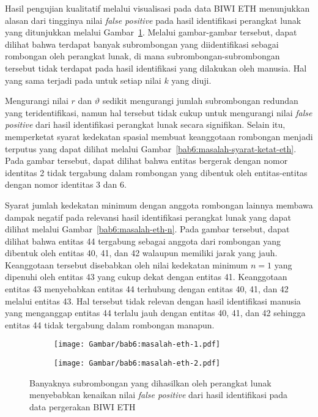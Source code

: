 Hasil pengujian kualitatif melalui visualisasi pada data BIWI ETH menunjukkan alasan dari tingginya nilai \textit{false positive} pada hasil identifikasi perangkat lunak yang ditunjukkan melalui Gambar~\ref{bab6:masalah-eth}. Melalui gambar-gambar tersebut, dapat dilihat bahwa terdapat banyak subrombongan yang diidentifikasi sebagai rombongan oleh perangkat lunak, di mana subrombongan-subrombongan tersebut tidak terdapat pada hasil identifikasi yang dilakukan oleh manusia. Hal yang sama terjadi pada untuk setiap nilai $k$ yang diuji.

Mengurangi nilai $r$ dan $\vartheta$ sedikit mengurangi jumlah subrombongan redundan yang teridentifikasi, namun hal tersebut tidak cukup untuk mengurangi nilai \textit{false positive} dari hasil identifikasi perangkat lunak secara signifikan. Selain itu, memperketat syarat kedekatan spasial membuat keanggotaan rombongan menjadi terputus yang dapat dilihat melalui Gambar~\ref{bab6:masalah-syarat-ketat-eth}. Pada gambar tersebut, dapat dilihat bahwa entitas bergerak dengan nomor identitas 2 tidak tergabung dalam rombongan yang dibentuk oleh entitas-entitas dengan nomor identitas 3 dan 6.

Syarat jumlah kedekatan minimum dengan anggota rombongan lainnya membawa dampak negatif pada relevansi hasil identifikasi perangkat lunak yang dapat dilihat melalui Gambar~\ref{bab6:masalah-eth-n}. Pada gambar tersebut, dapat dilihat bahwa entitas 44 tergabung sebagai anggota dari rombongan yang dibentuk oleh entitas 40, 41, dan 42 walaupun memiliki jarak yang jauh. Keanggotaan tersebut disebabkan oleh nilai kedekatan minimum $n = 1$ yang dipenuhi oleh entitas 43 yang cukup dekat dengan entitas 41. Keanggotaan entitas 43 menyebabkan entitas 44 terhubung dengan entitas 40, 41, dan 42 melalui entitas 43. Hal tersebut tidak relevan dengan hasil identifikasi manusia yang menganggap entitas 44 terlalu jauh dengan entitas 40, 41, dan 42 sehingga entitas 44 tidak tergabung dalam rombongan manapun.

\begin{figure}[h]
    \centering
    \captionsetup{width=.65\textwidth}
    \begin{subfigure}[t]{0.275\textwidth}
        \centering
        \texttt{[image: Gambar/bab6:masalah-eth-1.pdf]}
    \end{subfigure}
    \begin{subfigure}[t]{0.275\textwidth}
        \centering
        \texttt{[image: Gambar/bab6:masalah-eth-2.pdf]}
    \end{subfigure}
    \caption[Subrombongan pada data BIWI ETH]{Banyaknya subrombongan yang dihasilkan oleh perangkat lunak menyebabkan kenaikan nilai \textit{false positive} dari hasil identifikasi pada data pergerakan BIWI ETH}
    \label{bab6:masalah-eth}
\end{figure}

